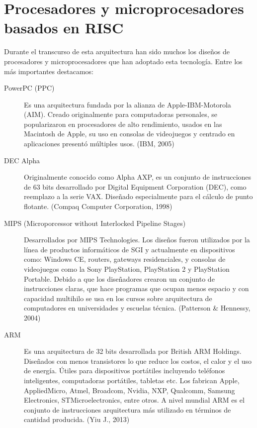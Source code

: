 \documentclass[10pt,a4paper]{article}
\begin{document}
\section*{Procesadores y microprocesadores basados en RISC}
Durante el transcurso de esta arquitectura han sido muchos los diseños de procesadores y microprocesadores que han adoptado esta tecnología. Entre los más importantes destacamos:
\begin{description}
\item[PowerPC (PPC)] Es una arquitectura fundada por la alianza de Apple-IBM-Motorola (AIM). Creado originalmente para computadoras personales, se popularizaron en  procesadores de alto rendimiento, usados en las Macintosh de Apple, su uso en consolas de videojuegos y centrado en aplicaciones presentó múltiples usos. (IBM, 2005)

\item[DEC Alpha]
Originalmente conocido como Alpha AXP, es un conjunto de instrucciones de 63 bits desarrollado por Digital Equipment Corporation (DEC), como reemplazo a la serie VAX. Diseñado especialmente para el cálculo de punto flotante. (Compaq Computer Corporation, 1998)

\item[MIPS (Microporcessor without Interlocked Pipeline Stages)]
Desarrollados por MIPS Technologies. Los diseños fueron utilizados por la línea de productos informáticos de SGI y actualmente en dispositivos como: Windows CE, routers, gateways residenciales, y consolas de videojuegos como la Sony PlayStation, PlayStation 2 y PlayStation Portable. Debido a que los diseñadores crearon un conjunto de instrucciones claras, que hace programas que ocupan menos espacio y con capacidad multihilo se usa en los cursos sobre arquitectura de computadores en universidades y escuelas técnica. (Patterson \& Hennessy, 2004)

\item[ARM]
Es una arquitectura  de 32 bits desarrollada por British ARM Holdings. Diseñados con menos transistores  lo que reduce los costos, el calor y el uso de energía. Útiles para dispositivos portátiles incluyendo teléfonos inteligentes, computadoras portátiles, tabletas etc. Los fabrican Apple, AppliedMicro, Atmel, Broadcom, Nvidia, NXP, Qualcomm, Samsung Electronics, STMicroelectronics, entre otros. A nivel mundial ARM es el conjunto de instrucciones arquitectura más utilizado en términos de cantidad producida. (Yiu J., 2013) 

\end{description}
\end{document}
